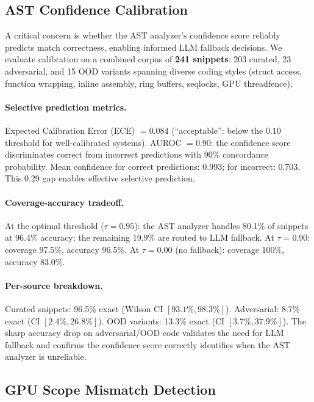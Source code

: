 \documentclass[11pt]{article}
\begin{document}
\subsection{AST Confidence Calibration}
\label{sec:calibration}

A critical concern is whether the AST analyzer's confidence score
reliably predicts match correctness, enabling informed LLM fallback
decisions.  We evaluate calibration on a combined corpus of \textbf{241 snippets}:
203 curated, 23 adversarial, and 15 OOD variants spanning diverse
coding styles (struct access, function wrapping, inline assembly,
ring buffers, seqlocks, GPU threadfence).

\paragraph{Selective prediction metrics.}
Expected Calibration Error (ECE) $= 0.084$ (``acceptable'': below
the $0.10$ threshold for well-calibrated systems).
AUROC $= 0.90$: the confidence score discriminates correct from
incorrect predictions with 90\% concordance probability.
Mean confidence for correct predictions: 0.993; for incorrect: 0.703.
This 0.29 gap enables effective selective prediction.

\paragraph{Coverage-accuracy tradeoff.}
At the optimal threshold ($\tau = 0.95$): the AST analyzer handles
80.1\% of snippets at 96.4\% accuracy; the remaining 19.9\% are
routed to LLM fallback.  At $\tau = 0.90$: coverage 97.5\%, accuracy
96.5\%.  At $\tau = 0.00$ (no fallback): coverage 100\%, accuracy 83.0\%.

\paragraph{Per-source breakdown.}
Curated snippets: 96.5\% exact (Wilson CI $[93.1\%, 98.3\%]$).
Adversarial: 8.7\% exact (CI $[2.4\%, 26.8\%]$).
OOD variants: 13.3\% exact (CI $[3.7\%, 37.9\%]$).
The sharp accuracy drop on adversarial/OOD code validates the
need for LLM fallback and confirms the confidence score correctly
identifies when the AST analyzer is unreliable.

\subsection{GPU Scope Mismatch Detection}
\label{sec:gpu-scope}
\end{document}
